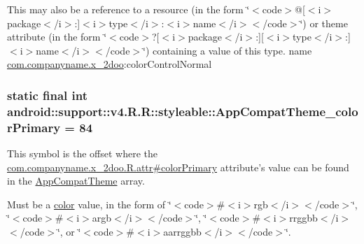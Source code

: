 This may also be a reference to a resource (in the form \char`\"{}$<$code$>$@\mbox{[}$<$i$>$package$<$/i$>$:\mbox{]}$<$i$>$type$<$/i$>$:$<$i$>$name$<$/i$>$$<$/code$>$\char`\"{}) or theme attribute (in the form \char`\"{}$<$code$>$?\mbox{[}$<$i$>$package$<$/i$>$:\mbox{]}\mbox{[}$<$i$>$type$<$/i$>$:\mbox{]}$<$i$>$name$<$/i$>$$<$/code$>$\char`\"{}) containing a value of this type.  name \hyperlink{namespacecom_1_1companyname_1_1x__2doo}{com.companyname.x\_\-2doo}:colorControlNormal \hypertarget{classandroid_1_1support_1_1v4_1_1_r_1_1styleable_000f8fd391639a0e396991fb848871f7}{
\subsubsection[{AppCompatTheme\_\-colorPrimary}]{\setlength{\rightskip}{0pt plus 5cm}static final int android::support::v4.R.R::styleable::AppCompatTheme\_\-colorPrimary = 84}}
\label{classandroid_1_1support_1_1v4_1_1_r_1_1styleable_000f8fd391639a0e396991fb848871f7}


This symbol is the offset where the \hyperlink{classcom_1_1companyname_1_1x__2doo_1_1_r_1_1attr_0444fdeaecab1522a203ba5b0bc9abfd}{com.companyname.x\_\-2doo.R.attr\#colorPrimary} attribute's value can be found in the \hyperlink{classandroid_1_1support_1_1v4_1_1_r_1_1styleable_0873e92ba21076bb5a4aeadeb7f5779f}{AppCompatTheme} array.

Must be a \hyperlink{classandroid_1_1support_1_1v4_1_1_r_1_1color}{color} value, in the form of \char`\"{}$<$code$>$\#$<$i$>$rgb$<$/i$>$$<$/code$>$\char`\"{}, \char`\"{}$<$code$>$\#$<$i$>$argb$<$/i$>$$<$/code$>$\char`\"{}, \char`\"{}$<$code$>$\#$<$i$>$rrggbb$<$/i$>$$<$/code$>$\char`\"{}, or \char`\"{}$<$code$>$\#$<$i$>$aarrggbb$<$/i$>$$<$/code$>$\char`\"{}. 

